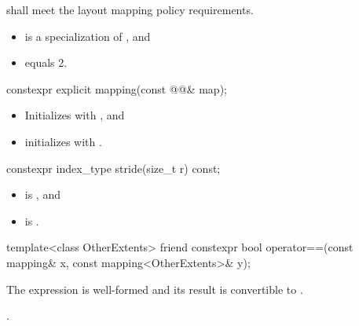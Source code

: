 \pnum
{} shall meet
the layout mapping policy requirements.

\pnum
\mandates
\begin{itemize}
\item
{} is a specialization of , and
\item
{} equals 2.
\end{itemize}

%
\begin{itemdecl}
constexpr explicit mapping(const @@& map);
\end{itemdecl}

\begin{itemdescr}
\pnum
\effects
\begin{itemize}
\item
Initializes  with , and
\item
initializes 
with .
\end{itemize}
\end{itemdescr}

%
\begin{itemdecl}
constexpr index_type stride(size_t r) const;
\end{itemdecl}

\begin{itemdescr}
\pnum
\expects
\begin{itemize}
\item
{} is , and
\item
{} is .
\end{itemize}

\pnum
\returns
{}
\end{itemdescr}

%
\begin{itemdecl}
template<class OtherExtents>
  friend constexpr bool operator==(const mapping& x, const mapping<OtherExtents>& y);
\end{itemdecl}

\begin{itemdescr}
\pnum
\constraints
The expression
is well-formed and its result is convertible to .

\pnum
\returns
{}.
\end{itemdescr}

